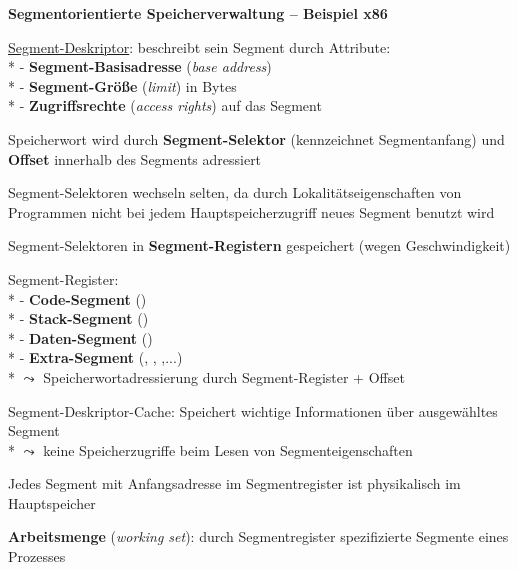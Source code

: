 \textbf{Segmentorientierte Speicherverwaltung -- Beispiel x86}
\begin{items}
  \item \underline{Segment-Deskriptor}: beschreibt sein Segment durch Attribute: \\*
    - \textbf{Segment-Basisadresse} (\emph{base address}) \\*
    - \textbf{Segment-Größe} (\emph{limit}) in Bytes \\*
    - \textbf{Zugriffsrechte} (\emph{access rights}) auf das Segment
  \item Speicherwort wird durch \textbf{Segment-Selektor} (kennzeichnet Segmentanfang) und \textbf{Offset} innerhalb des Segments adressiert
  \item Segment-Selektoren wechseln selten, da durch Lokalitätseigenschaften von Programmen nicht bei jedem Hauptspeicherzugriff neues Segment benutzt wird
  \item Segment-Selektoren in \textbf{Segment-Registern} gespeichert (wegen Geschwindigkeit)
  \item Segment-Register: \\*
    - \textbf{Code-Segment} () \\*
    - \textbf{Stack-Segment} () \\*
    - \textbf{Daten-Segment} () \\*
    - \textbf{Extra-Segment} (, , ,...) \\*
    \( \leadsto \) Speicherwortadressierung durch Segment-Register + Offset
  \item Segment-Deskriptor-Cache: Speichert wichtige Informationen über ausgewähltes Segment \\*
    \( \leadsto \) keine Speicherzugriffe beim Lesen von Segmenteigenschaften
  \item Jedes Segment mit Anfangsadresse im Segmentregister ist physikalisch im Hauptspeicher
  \item \textbf{Arbeitsmenge} (\emph{working set}): durch Segmentregister spezifizierte Segmente eines Prozesses
\end{items}

